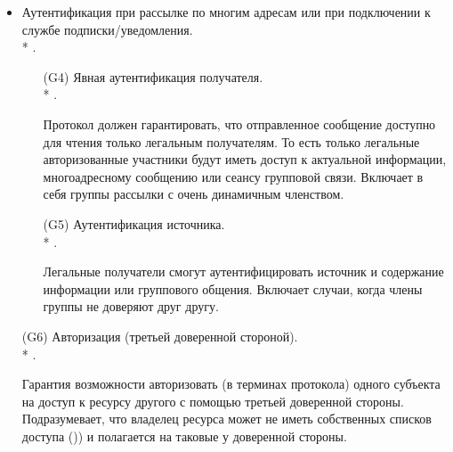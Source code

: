 \begin{itemize}
	\item Аутентификация при рассылке по многим адресам или при подключении к службе подписки/уведомления.\\*
		.
	\begin{itemize}
		\item[(G4)] Явная аутентификация получателя.\\*
			.
		\item[{}] Протокол должен гарантировать, что отправленное сообщение доступно для чтения только легальным получателям. То есть только легальные авторизованные участники будут иметь доступ к актуальной информации, многоадресному сообщению или сеансу групповой связи. Включает в себя группы рассылки с очень динамичным членством.
		\item[(G5)] Аутентификация источника.\\*
			.
		\item[{}] Легальные получатели смогут аутентифицировать источник и содержание информации или группового общения. Включает случаи, когда члены группы не доверяют друг другу.
	\end{itemize}

	\item[(G6)] Авторизация (третьей доверенной стороной).\\*
		.
	\item[{}] Гарантия возможности авторизовать (в терминах протокола) одного субъекта на доступ к ресурсу другого с помощью третьей доверенной стороны. Подразумевает, что владелец ресурса может не иметь собственных списков доступа ()) и полагается на таковые у доверенной стороны.


\end{itemize}
